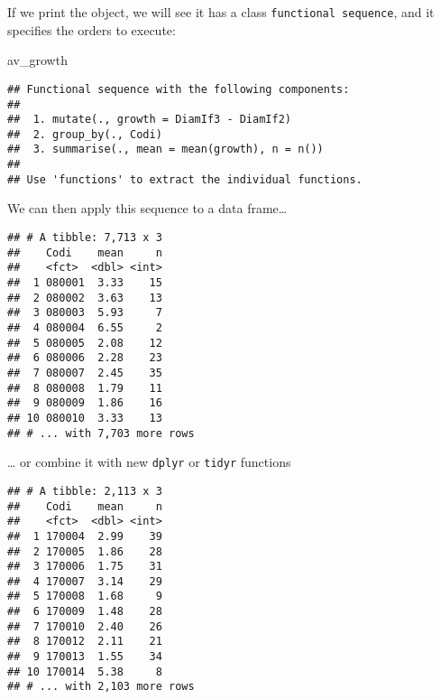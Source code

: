 \documentclass[]{article}
\newenvironment{Shaded}{\begin{snugshade}}{\end{snugshade}}
\newcommand{\KeywordTok}[1]{\textcolor[rgb]{0.13,0.29,0.53}{\textbf{#1}}}
\newcommand{\StringTok}[1]{\textcolor[rgb]{0.31,0.60,0.02}{#1}}
\newcommand{\OperatorTok}[1]{\textcolor[rgb]{0.81,0.36,0.00}{\textbf{#1}}}
\newcommand{\NormalTok}[1]{#1}
\begin{document}
If we print the object, we will see it has a class
\texttt{functional\ sequence}, and it specifies the orders to execute:

\begin{Shaded}
\begin{Highlighting}[]
\NormalTok{av_growth}
\end{Highlighting}
\end{Shaded}

\begin{verbatim}
## Functional sequence with the following components:
## 
##  1. mutate(., growth = DiamIf3 - DiamIf2)
##  2. group_by(., Codi)
##  3. summarise(., mean = mean(growth), n = n())
## 
## Use 'functions' to extract the individual functions.
\end{verbatim}

We can then apply this sequence to a data frame\ldots{}

\begin{Shaded}
\end{Shaded}

\begin{verbatim}
## # A tibble: 7,713 x 3
##    Codi    mean     n
##    <fct>  <dbl> <int>
##  1 080001  3.33    15
##  2 080002  3.63    13
##  3 080003  5.93     7
##  4 080004  6.55     2
##  5 080005  2.08    12
##  6 080006  2.28    23
##  7 080007  2.45    35
##  8 080008  1.79    11
##  9 080009  1.86    16
## 10 080010  3.33    13
## # ... with 7,703 more rows
\end{verbatim}

\ldots{} or combine it with new \texttt{dplyr} or \texttt{tidyr}
functions

\begin{Shaded}
\end{Shaded}

\begin{verbatim}
## # A tibble: 2,113 x 3
##    Codi    mean     n
##    <fct>  <dbl> <int>
##  1 170004  2.99    39
##  2 170005  1.86    28
##  3 170006  1.75    31
##  4 170007  3.14    29
##  5 170008  1.68     9
##  6 170009  1.48    28
##  7 170010  2.40    26
##  8 170012  2.11    21
##  9 170013  1.55    34
## 10 170014  5.38     8
## # ... with 2,103 more rows
\end{verbatim}
\end{document}
